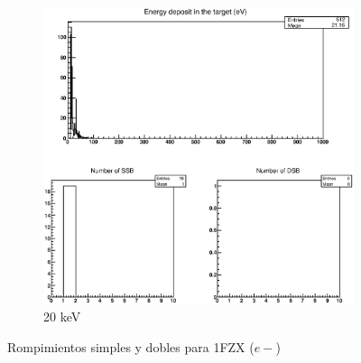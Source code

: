 \begin{figure}
\begin{subfigure}{.5\textwidth}
  \includegraphics[width=.78\linewidth]{./Figures/7.eps}
  \caption{20 keV}
  \label{fig:sube8}
\end{subfigure}
\caption{Rompimientos simples y dobles para 1FZX ($e-$)}
\label{fig:e2}
\end{figure}




